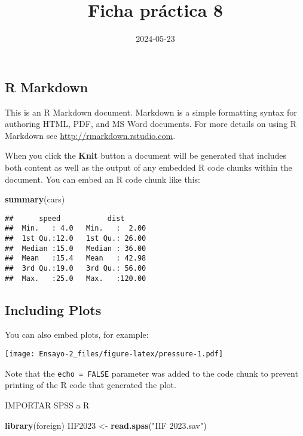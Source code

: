 \documentclass[
]{article}
\title{Ficha práctica 8}
\author{}
\date{\vspace{-2.5em}2024-05-23}
\newenvironment{Shaded}{\begin{snugshade}}{\end{snugshade}}
\newcommand{\FunctionTok}[1]{\textcolor[rgb]{0.13,0.29,0.53}{\textbf{#1}}}
\newcommand{\NormalTok}[1]{#1}
\newcommand{\OtherTok}[1]{\textcolor[rgb]{0.56,0.35,0.01}{#1}}
\newcommand{\StringTok}[1]{\textcolor[rgb]{0.31,0.60,0.02}{#1}}
\begin{document}
\maketitle

\hypertarget{r-markdown}{%
\subsection{R Markdown}\label{r-markdown}}

This is an R Markdown document. Markdown is a simple formatting syntax
for authoring HTML, PDF, and MS Word documents. For more details on
using R Markdown see \url{http://rmarkdown.rstudio.com}.

When you click the \textbf{Knit} button a document will be generated
that includes both content as well as the output of any embedded R code
chunks within the document. You can embed an R code chunk like this:

\begin{Shaded}
\begin{Highlighting}[]
\FunctionTok{summary}\NormalTok{(cars)}
\end{Highlighting}
\end{Shaded}

\begin{verbatim}
##      speed           dist       
##  Min.   : 4.0   Min.   :  2.00  
##  1st Qu.:12.0   1st Qu.: 26.00  
##  Median :15.0   Median : 36.00  
##  Mean   :15.4   Mean   : 42.98  
##  3rd Qu.:19.0   3rd Qu.: 56.00  
##  Max.   :25.0   Max.   :120.00
\end{verbatim}

\hypertarget{including-plots}{%
\subsection{Including Plots}\label{including-plots}}

You can also embed plots, for example:

\texttt{[image: Ensayo-2\_files/figure-latex/pressure-1.pdf]}

Note that the \texttt{echo\ =\ FALSE} parameter was added to the code
chunk to prevent printing of the R code that generated the plot.

IMPORTAR SPSS a R

\begin{Shaded}
\begin{Highlighting}[]
\FunctionTok{library}\NormalTok{(foreign) }
\NormalTok{IIF2023 }\OtherTok{\textless{}{-}} \FunctionTok{read.spss}\NormalTok{(}\StringTok{"IIF 2023.sav"}\NormalTok{) }
\end{Highlighting}
\end{Shaded}
\end{document}
